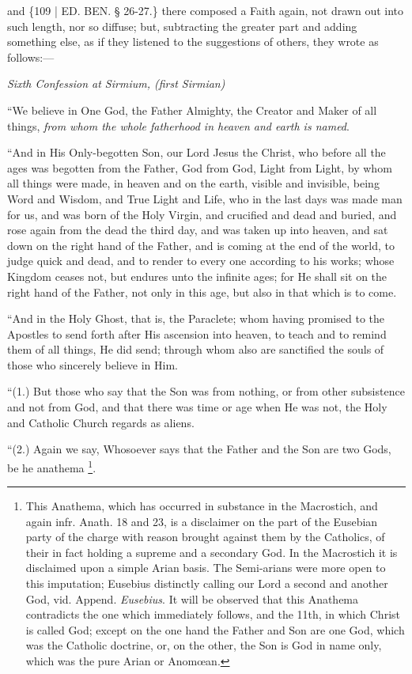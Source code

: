 and \{109 | ED. BEN. § 26-27.\} there
composed a Faith again, not drawn out into such length, nor so
diffuse; but, subtracting the greater part and adding something else,
as if they listened to the suggestions of others, they wrote as
follows:—

\emph{Sixth
Confession at Sirmium, (first Sirmian)}

``We believe in One God, the
Father Almighty, the Creator and Maker of all things, \emph{from whom the
whole fatherhood in heaven and earth is named}.

``And in His Only-begotten Son,
our Lord Jesus the Christ, who before all the ages was begotten from
the Father, God from God, Light from Light, by whom all things were
made, in heaven and on the earth, visible and invisible, being Word
and Wisdom, and True Light and Life, who in the last days was made man
for us, and was born of the Holy Virgin, and crucified and dead
and buried, and rose again from the dead the third day, and was taken
up into heaven, and sat down on the right hand of the Father, and is
coming at the end of the world, to judge quick and dead, and to render
to every one according to his works; whose Kingdom ceases not, but
endures unto the infinite ages; for He shall sit on the right hand of
the Father, not only in this age, but also in that which is to come.

``And in the Holy Ghost, that
is, the Paraclete; whom having promised to the Apostles to send forth
after His ascension into heaven, to teach and to remind them of all
things, He did send; through whom also are sanctified the souls of
those who sincerely believe in Him.

``(1.) But those who say that
the Son was from nothing, or from other subsistence and not from God,
and that there was time or age when He was not, the Holy and Catholic
Church regards as aliens.

``(2.) Again we say, Whosoever
says that the Father and the Son are two Gods, be he anathema \footnote{This Anathema, which has occurred in substance in the Macrostich, and
again infr. Anath. 18 and 23, is a disclaimer on the part of the
Eusebian party of the charge with reason brought against them by the
Catholics, of their in fact holding a supreme and a secondary God. In
the Macrostich it is disclaimed upon a simple Arian basis. The Semi-arians
were more open to this imputation; Eusebius distinctly calling our
Lord a second and another God, vid. Append. \emph{Eusebius}. It will
be observed that this Anathema contradicts the one which immediately
follows, and the 11th, in which Christ is called God; except on the
one hand the Father and Son are one God, which was the Catholic
doctrine, or, on the other, the Son is God in name only, which was the
pure Arian or Anomœan.}.

